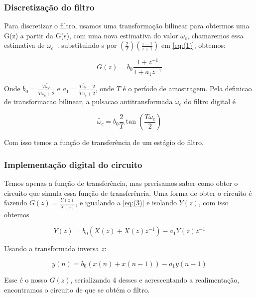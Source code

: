 \documentclass{article}
\begin{document}
\subsubsection{Discretização do filtro}

Para discretizar o filtro, usamos uma transformação bilinear para obtermos uma G(z) a partir da G(s), 
com uma nova estimativa do valor $\omega_c$, chamaremos essa estimativa de $\omega_c$~.
substituindo s por $(\frac{2}{T})(\frac{z-1}{z+1})$ em \ref{eq:(1)}, obtemos:

\begin{equation}\label{eq:(3)}
G(z) = b_0 \frac{1+z^{-1}}{1+a_1 z^{-1}}  
\end{equation}


Onde $b_0 = \frac{T \tilde{\omega_c}}{T \tilde{\omega_c}+2}$ e $a_1 = \frac{T \tilde{\omega_c} -2}{T\tilde{\omega_c} +2}$, onde $T$ é o período de amostragem.
Pela definicao de transformacao bilinear, a pulsacao antitransformada $\tilde{\omega_c}$ do filtro digital é

\begin{equation}\label{eq:(4)}
\tilde{\omega_c} = b_0 \frac{2}{T} \tan({\frac{T \omega_c}{2}} ) 
\end{equation}

Com isso temos a função de transferência de um estágio do filtro.

\subsubsection{Implementação digital do circuito}

Temos apenas a função de transferência, mas precisamos saber como obter o circuito que simula essa função de transferência.
Uma forma de obter o circuito é fazendo $G(z) = \frac{Y(z)}{X(z)}$, e igualando a \ref{eq:(3)} e isolando $Y(z)$, com isso obtemos


\begin{equation}\label{eq:(5)}
Y(z) = b_0(X(z)+X(z)z^{-1})-a_1Y(z)z^{-1}
\end{equation}

Usando a transformada inversa $z$:

\begin{equation}\label{eq:(6)}
y(n)=b_0(x(n)+x(n-1))-a_1 y(n-1)  
\end{equation}


Esse é o nosso $G(z)$, serializando 4 desses e acrescentando a realimentação, encontramos o circuito de que se obtém o filtro.
\end{document}
